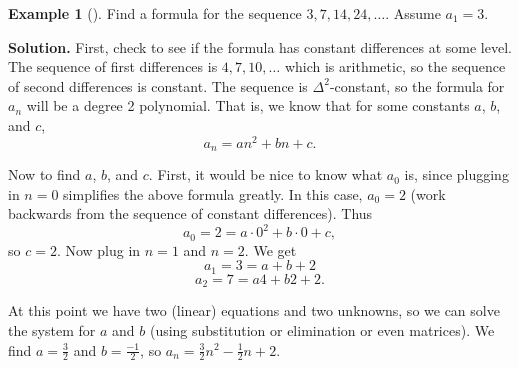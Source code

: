 \documentclass[12pt,]{book}
\theoremstyle{plain}
\theoremstyle{definition}
\theoremstyle{definition}
\newtheorem{example}[theorem]{Example}
\theoremstyle{definition}
\numberwithin{equation}{chapter}
\begin{document}
\begin{example}[]\label{example-15}
\hypertarget{p-237}{}%
Find a formula for the sequence \(3, 7, 14, 24,\ldots\). Assume \(a_1 = 3\).%
\par\smallskip%
\noindent\textbf{Solution.}\hypertarget{solution-26}{}\quad%
\hypertarget{p-238}{}%
First, check to see if the formula has constant differences at some level. The sequence of first differences is \(4, 7, 10, \ldots\) which is arithmetic, so the sequence of second differences is constant. The sequence is \(\Delta^2\)-constant, so the formula for \(a_n\) will be a degree 2 polynomial. That is, we know that for some constants \(a\), \(b\), and \(c\),%
\begin{equation*}
a_n = an^2 + bn + c.
\end{equation*}
%
\par
\hypertarget{p-239}{}%
Now to find \(a\), \(b\), and \(c\). First, it would be nice to know what \(a_0\) is, since plugging in \(n = 0\) simplifies the above formula greatly. In this case, \(a_0 = 2\) (work backwards from the sequence of constant differences). Thus%
\begin{equation*}
a_0 = 2 = a\cdot 0^2 + b \cdot 0 + c,
\end{equation*}
so \(c = 2\). Now plug in \(n =1\) and \(n = 2\). We get%
\begin{equation*}
a_1 = 3 = a + b + 2
\end{equation*}
%
\begin{equation*}
a_2 = 7 = a4 + b 2 + 2.
\end{equation*}
%
\par
\hypertarget{p-240}{}%
At this point we have two (linear) equations and two unknowns, so we can solve the system for \(a\) and \(b\) (using substitution or elimination or even matrices). We find \(a = \frac{3}{2}\) and \(b = \frac{-1}{2}\), so \(a_n = \frac{3}{2} n^2 - \frac{1}{2}n + 2\).%
\end{example}
\end{document}
